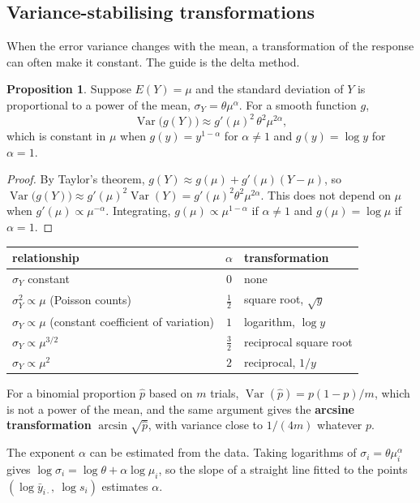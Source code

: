 \documentclass[11pt,a4paper]{article}
\numberwithin{equation}{section}
\DeclareMathOperator{\Var}{Var}
\theoremstyle{definition}
\newtheorem{prop}[thm]{Proposition}
\begin{document}
\subsection{Variance-stabilising transformations}
When the error variance changes with the mean, a transformation of the response can often make it constant. The guide is the delta method.

\begin{prop}\label{prop:vst}
Suppose $E(Y) = \mu$ and the standard deviation of $Y$ is proportional to a power of the mean, $\sigma_Y = \theta\mu^\alpha$. For a smooth function $g$,
\[
\Var\bigl(g(Y)\bigr) \approx g'(\mu)^2\,\theta^2\mu^{2\alpha} ,
\]
which is constant in $\mu$ when $g(y) = y^{1-\alpha}$ for $\alpha \ne 1$ and $g(y) = \log y$ for $\alpha = 1$.
\end{prop}

\begin{proof}
By Taylor's theorem, $g(Y) \approx g(\mu) + g'(\mu)(Y - \mu)$, so $\Var\bigl(g(Y)\bigr) \approx g'(\mu)^2\Var(Y) = g'(\mu)^2\theta^2\mu^{2\alpha}$. This does not depend on $\mu$ when
$g'(\mu) \propto \mu^{-\alpha}$. Integrating, $g(\mu) \propto \mu^{1-\alpha}$ if $\alpha \ne 1$ and $g(\mu) = \log\mu$ if $\alpha = 1$.
\end{proof}

\begin{center}
\begin{tabular}{l|c|l}
relationship & $\alpha$ & transformation \\
\hline
$\sigma_Y$ constant & $0$ & none \\
$\sigma_Y^2 \propto \mu$ (Poisson counts) & $\frac12$ & square root, $\sqrt y$ \\
$\sigma_Y \propto \mu$ (constant coefficient of variation) & $1$ & logarithm, $\log y$ \\
$\sigma_Y \propto \mu^{3/2}$ & $\frac32$ & reciprocal square root \\
$\sigma_Y \propto \mu^2$ & $2$ & reciprocal, $1/y$
\end{tabular}
\end{center}

For a binomial proportion $\hat p$ based on $m$ trials, $\Var(\hat p) = p(1 - p)/m$, which is not a power of the mean, and the same argument gives the
\textbf{arcsine transformation} $\arcsin\sqrt{\hat p}$, with variance close to $1/(4m)$ whatever $p$.

The exponent $\alpha$ can be estimated from the data. Taking logarithms of $\sigma_i = \theta\mu_i^\alpha$ gives $\log\sigma_i = \log\theta + \alpha\log\mu_i$, so the slope of a straight line
fitted to the points $(\log\bar y_{i\cdot},\ \log s_i)$ estimates $\alpha$.
\end{document}
